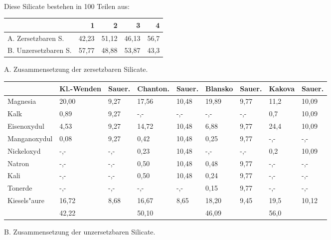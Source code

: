 \documentclass[a4paper, 11pt, oneside]{article}
\begin{document}
\paragraph{}
Diese Silicate bestehen in 100 Teilen aus:
\begin{center}
\begin{tabular}{ |l|r|r|r|r| }
    \hline
     & 1 & 2 & 3 & 4\\
    \hline\hline
    A. Zersetzbaren S. & 42,23 & 51,12 & 46,13 & 56,7\\\hline
    B. Unzersetzbaren S. & 57,77 & 48,88 & 53,87 & 43,3\\
    \hline
\end{tabular}
\end{center}
\clearpage
\begin{center}
A. Zusammensetzung der zersetzbaren Silicate.
\end{center}
\begin{center}
\begin{tabular}{ |p{23mm}|p{12mm}|p{8mm}|p{13mm}|p{8mm}|p{11mm}|p{8mm}|p{10mm}|p{8mm}| }
    \hline
     & Kl.-Wenden & Sauer. & Chanton. & Sauer. & Blansko & Sauer. & Kakova & Sauer.\\
    \hline\hline
    Magnesia & 20,00 & 9,27 & 17,56 & 10,48 & 19,89 & 9,77 & 11,2 & 10,09\\\hline
    Kalk & 0,89 & 9,27 & -,- & -,- & -,- & -,- & 0,7 & 10,09\\\hline
    Eisenoxydul & 4,53 & 9,27 & 14,72 & 10,48 & 6,88 & 9,77 & 24,4 & 10,09\\\hline
    Manganoxydul & 0,08 & 9,27 & 0,42 & 10,48 & 0,25 & 9,77 & -,- & -,-\\\hline
    Nickeloxyd & -,- & -,- & 0,23 & 10,48 & -,- & -,- & 0,2 & 10,09\\\hline
    Natron & -,- & -,- & 0,50 & 10,48 & 0,48 & 9,77 & -,- & -,-\\\hline
    Kali & -,- & -,- & 0,50 & 10,48 & 0,24 & 9,77 & -,- & -,-\\\hline
    Tonerde & -,- & -,- & -,- & -,- & 0,15 & 9,77 & -,- & -,-\\\hline
    Kiesels"aure & 16,72 & 8,68 & 16,67 & 8,65 & 18,20 & 9,45 & 19,5 & 10,12\\\hline
     & 42,22 & & 50,10 & & 46,09 & & 56,0 & \\
    \hline
\end{tabular}
\end{center}
\vspace{\medskipamount}
\begin{center}
B. Zusammensetzung der unzersetzbaren Silicate.
\end{center}
\end{document}
